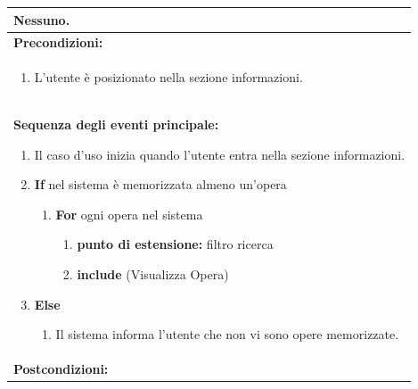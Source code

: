 \documentclass{article}
\begin{document}
\begin{table}[t]
\begin{tabular}{|p{\linewidth}|}
                        Nessuno. \\
                        \hline
                        \cellcolor{gray!20}
                        \textbf{Precondizioni:} \\
                        \cellcolor{gray!20}
                        \begin{minipage}{\linewidth}
                            \begin{enumerate}[noitemsep]
                                \item L'utente è posizionato nella sezione informazioni.
                            \end{enumerate}
                        \end{minipage} \\
                        \hline
                        \textbf{Sequenza degli eventi principale:}
                        \begin{enumerate}
                            \item Il caso d'uso inizia quando l'utente entra nella sezione informazioni.
                            \item \textbf{If} nel sistema è memorizzata almeno un'opera
                            \begin{enumerate}
                                \item \textbf{For} ogni opera nel sistema
                                \begin{enumerate}
                                    \item[] \textbf{punto di estensione:} filtro ricerca
                                    \item \textbf{include} (Visualizza Opera)
                                \end{enumerate}
                            \end{enumerate}
                            \item \textbf{Else}
                            \begin{enumerate}
                                \item Il sistema informa l'utente che non vi sono opere memorizzate.
                            \end{enumerate}
                        \end{enumerate} \\
                        \hline
                        \cellcolor{gray!20}
                        \textbf{Postcondizioni:} \\

\end{tabular}
\end{table}
\end{document}
